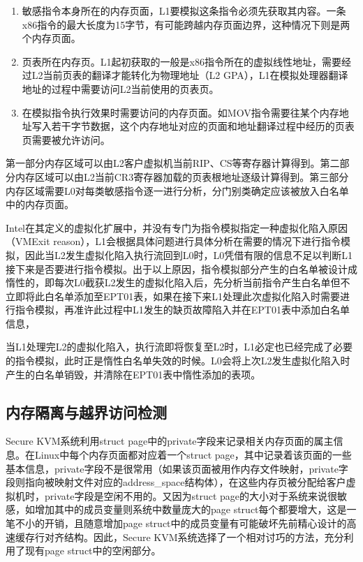 \begin{enumerate}
\item 敏感指令本身所在的内存页面，L1要模拟这条指令必须先获取其内容。一条x86指令的最大长度为15字节，有可能跨越内存页面边界，这种情况下则是两个内存页面。
\item 页表所在内存页。L1起初获取的一般是x86指令所在的虚拟线性地址，需要经过L2当前页表的翻译才能转化为物理地址（L2 GPA），L1在模拟处理器翻译地址的过程中需要访问L2当前使用的页表页。
\item 在模拟指令执行效果时需要访问的内存页面。如MOV指令需要往某个内存地址写入若干字节数据，这个内存地址对应的页面和地址翻译过程中经历的页表页需要被允许访问。
\end{enumerate}

第一部分内存区域可以由L2客户虚拟机当前RIP、CS等寄存器计算得到。第二部分内存区域可以由L2当前CR3寄存器加载的页表根地址逐级计算得到。第三部分内存区域需要L0对每类敏感指令逐一进行分析，分门别类确定应该被放入白名单中的内存页面。

Intel在其定义的虚拟化扩展中，并没有专门为指令模拟指定一种虚拟化陷入原因（VMExit reason），L1会根据具体问题进行具体分析在需要的情况下进行指令模拟，因此当L2发生虚拟化陷入执行流回到L0时，L0凭借有限的信息不足以判断L1接下来是否要进行指令模拟。出于以上原因，指令模拟部分产生的白名单被设计成惰性的，即每次L0截获L2发生的虚拟化陷入后，先分析当前指令产生白名单但不立即将此白名单添加至EPT01表，如果在接下来L1处理此次虚拟化陷入时需要进行指令模拟，再准许此过程中L1发生的缺页故障陷入并在EPT01表中添加白名单信息，

当L1处理完L2的虚拟化陷入，执行流即将恢复至L2时，L1必定也已经完成了必要的指令模拟，此时正是惰性白名单失效的时候。L0会将上次L2发生虚拟化陷入时产生的白名单销毁，并清除在EPT01表中惰性添加的表项。

\subsection{内存隔离与越界访问检测}
Secure KVM系统利用struct page中的private字段来记录相关内存页面的属主信息。在Linux中每个内存页面都对应着一个struct page，其中记录着该页面的一些基本信息，private字段不是很常用（如果该页面被用作内存文件映射，private字段则指向被映射文件对应的address\_space结构体），在这些内存页被分配给客户虚拟机时，private字段是空闲不用的。又因为struct page的大小对于系统来说很敏感，如增加其中的成员变量则系统中数量庞大的page struct每个都要增大，这是一笔不小的开销，且随意增加page struct中的成员变量有可能破坏先前精心设计的高速缓存行对齐结构。因此，Secure KVM系统选择了一个相对讨巧的方法，充分利用了现有page struct中的空闲部分。


